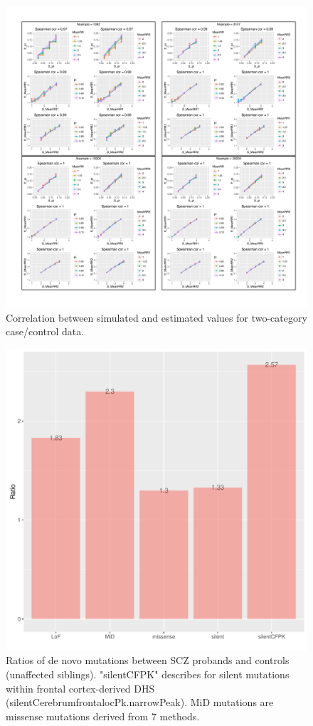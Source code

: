 \documentclass[]{article}
\begin{document}
\begin{figure}[H]
\includegraphics[width=\textwidth,height=\textwidth]{Picture/Simulation2CC.pdf}
\caption{Correlation between simulated and estimated values for
  two-category case/control data.}
\label{fig:2CCsimulatedData}
\end{figure}



\begin{figure}[H]
\includegraphics[width=\textwidth,height=\textwidth]{Picture/SCZ_DNcasecontrolRatio.pdf}
\caption{Ratios of de novo mutations between SCZ probands and controls
  (unaffected siblings). "silentCFPK" describes for silent mutations within frontal cortex-derived
  DHS (silentCerebrumfrontalocPk.narrowPeak). MiD mutations are missense mutations derived from
  7 methods. }
\label{tab:denovomutation}
\end{figure}
\end{document}
